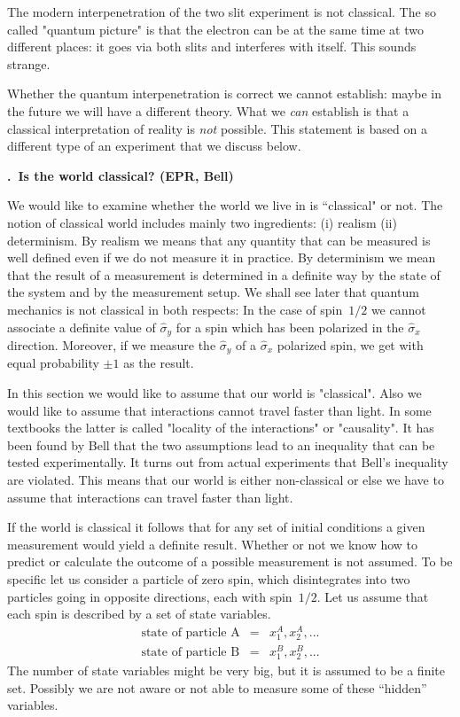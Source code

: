 \documentclass[onecolumn,fleqn, 11pt]{revtex4}
\newcommand{\beq}{\begin{eqnarray}}
\newcommand{\eeq}{\end{eqnarray}}
\renewcommand{\thesubsection}{\arabic{subsection}}
\renewcommand{\thesubsubsection}{\arabic{subsubsection}}
\newcommand{\sheadC}[1]
{
\addtocounter{subsubsection}{1}
\vspace{5mm}
{\bf \thesubsection.\thesubsubsection \ #1}  
\nopagebreak
\phantomsection
}
\begin{document}
The modern interpenetration of the two slit experiment is not classical. 
The so called "quantum picture" is that the electron can be at the same time at two different places:
it goes via both slits and interferes with itself. This sounds strange. 

Whether the quantum interpenetration is correct we cannot establish:
maybe in the future we will have a different theory.
What we {\em can} establish is that a classical interpretation
of reality is {\em not} possible. This statement is based on 
a different type of an experiment that we discuss below.   
  

\sheadC{Is the world classical? (EPR, Bell)}


We would like to examine whether the world we live 
in is ``classical" or not. The notion of 
classical world includes mainly two ingredients: 
(i) realism (ii) determinism.  
By realism we means that any quantity that can 
be measured is well defined even if we do not 
measure it in practice. By determinism we mean 
that the result of a measurement is determined 
in a definite way by the state of the system 
and by the measurement setup. We shall see later 
that quantum mechanics is not classical in both 
respects: In the case of spin~$1/2$ we cannot 
associate a definite value of $\hat{\sigma}_y$ 
for a spin which has been polarized in the $\hat{\sigma}_x$  
direction. Moreover, if we measure the $\hat{\sigma}_y$
of a $\hat{\sigma}_x$ polarized spin, 
we get with equal probability $\pm1$ as the result.
 
In this section we would like to assume that our 
world is "classical". Also we would like to assume    
that interactions cannot travel faster than light.  
In some textbooks the latter is called "locality 
of the interactions" or "causality". It has been found 
by Bell that the two assumptions lead to an inequality 
that can be tested experimentally. It turns out 
from actual experiments that Bell's inequality are violated. 
This means that our world is either non-classical or else we have 
to assume that interactions can travel faster than light.  


If the world is classical it follows  
that for any set of initial conditions 
a given measurement would yield a definite result. 
Whether or not we know how to predict or calculate 
the outcome of a possible measurement is not assumed.
To be specific let us consider a particle of zero spin, 
which disintegrates into two particles going
in opposite directions, each with spin~$1/2$. 
Let us assume that each spin is described 
by a set of state variables. 
\beq
\mbox{state of particle A} &=&  x^A_1, x^A_2, ... 
\\ \nonumber
\mbox{state of particle B} &=&  x^B_1, x^B_2, ...
\eeq
The number of state variables might be very big,
but it is assumed to be a finite set. Possibly we 
are not aware or not able to measure some of these ``hidden'' variables.
\end{document}

